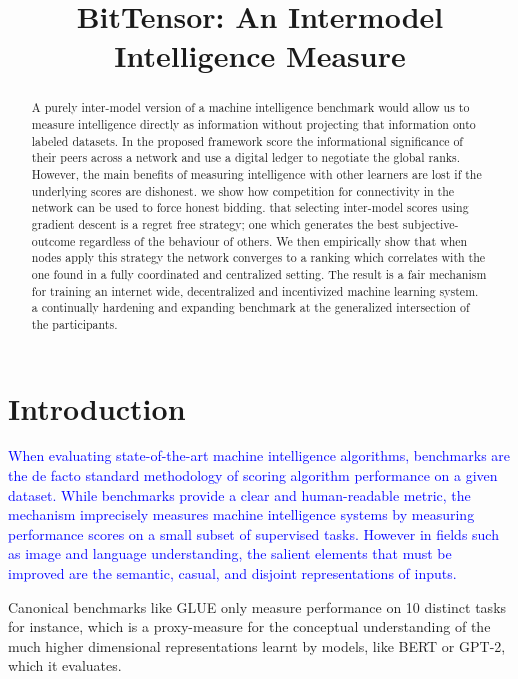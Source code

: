 \documentclass{article}
\title{BitTensor: An Intermodel Intelligence Measure}
\begin{document}
\maketitle

\begin{abstract}

A purely inter-model version of a machine intelligence benchmark would allow us to measure intelligence directly as information without projecting that information onto labeled datasets. In the proposed framework  score the informational significance of their peers across a network and use a digital ledger to negotiate the global ranks. However, the main benefits of measuring intelligence with other learners are lost if the underlying scores are dishonest.  we show how competition for connectivity in the network can be used to force honest bidding.  that selecting inter-model scores using gradient descent is a regret free strategy; one which generates the best subjective-outcome regardless of the behaviour of others. We then empirically show that when nodes apply this strategy the network converges to a ranking which correlates with the one found in a fully coordinated and centralized setting. The result is a fair mechanism for training an internet wide, decentralized and incentivized machine learning system.  a continually hardening and expanding benchmark at the generalized intersection of the participants.

\end{abstract}

\section{Introduction}

\textcolor{blue}{When evaluating state-of-the-art machine intelligence algorithms, benchmarks are the de facto standard methodology of scoring algorithm performance on a given dataset. 
While benchmarks provide a clear and human-readable metric, the mechanism imprecisely measures machine intelligence systems by measuring performance scores on a small subset of supervised tasks. However in fields such as image and language understanding, the salient elements that must be improved are the semantic, casual, and disjoint representations of inputs.}

Canonical benchmarks like GLUE \cite{wang2018glue} only measure performance on 10 distinct tasks for instance, which is a proxy-measure for the conceptual understanding of the much higher dimensional representations learnt by models, like BERT or GPT-2, which it evaluates. 
\end{document}
